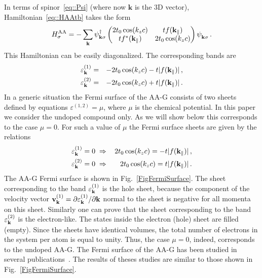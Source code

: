 \documentclass[prb,twocolumn,showpacs,aps,superscriptaddress,floatfix]{revtex4}
\begin{document}
In terms of spinor~\eqref{eq::Psi} (where now
$\mathbf{k}$
is the 3D vector), Hamiltonian~\eqref{eq::HAAtb} takes the form
\begin{equation}
\label{eq::h_AA}
H^{\rm AA}_{\sigma}=-\sum\limits_{\mathbf{k}}\psi^\dag_{{\bf k}\sigma}
\begin{pmatrix}
2 t_0 \cos(k_z c)& tf (\mathbf{k}_{\|})\\
tf^{*} (\mathbf{k}_{\|})& 2t_0\cos(k_z c)
\end{pmatrix}
\psi^{\phantom{\dag}}_{{\bf k}\sigma}\,.
\end{equation}
This Hamiltonian can be easily diagonalized. The corresponding bands are
\begin{eqnarray}
\varepsilon^{(1)}_{\bf k}&=&-2 t_0 \cos(k_z c)-t |f(\mathbf{k}_{\|})|\,,
\nonumber\\
\varepsilon^{(2)}_{\bf k}&=&-2 t_0 \cos(k_z c)+t |f(\mathbf{k}_{\|})|\,.
\label{eq::tb_bands}
\end{eqnarray}
In a generic situation the Fermi surface of the AA-G consists of two sheets
defined by equations
$\varepsilon^{(1,2)} = \mu$,
where $\mu$ is the chemical potential. In this paper we consider the
undoped compound only. As we will show below this corresponds to the case
$\mu = 0$.
For such a value of $\mu$ the Fermi surface sheets are given by the
relations
\begin{eqnarray}
\varepsilon^{(1)}_{\bf k}=0\;
\Rightarrow\,&&
2t_0\cos(k_{z}c)=-t|f(\mathbf{k}_{\|})|\,,
\label{eq::sheet1}
\\
\varepsilon^{(2)}_{\bf k}=0\;
\Rightarrow\,&&
2t_0\cos(k_{z}c)=t|f(\mathbf{k}_{\|})|\,.
\label{eq::sheet2}
\end{eqnarray}
The AA-G Fermi surface is shown in
Fig.~\ref{FigFermiSurface}. The sheet corresponding to the band
$\varepsilon^{(1)}_{\bf k}$
is the hole sheet, because the component of the velocity vector
$\mathbf{v}_{\mathbf{k}}^{(1)}=\partial\varepsilon^{(1)}_{\bf k}/\partial\mathbf{k}$
normal to the sheet is negative for all momenta on this sheet. Similarly one can prove that the sheet corresponding to the band
$\varepsilon^{(2)}_{\bf k}$
is the electron-like. The states inside the electron (hole) sheet are
filled (empty). Since the sheets have identical volumes, the total number
of electrons in the system per atom is equal to unity. Thus, the case
$\mu=0$,
indeed, corresponds to the undoped AA-G. The Fermi surface of the AA-G has
been studied in several
publications~\cite{aa_graphite_charlier1994,aa_tb_charlier1991,
aa_abinit_charlier1992}.
The results of theses studies are similar to those shown in
Fig.~\ref{FigFermiSurface}.
\end{document}
